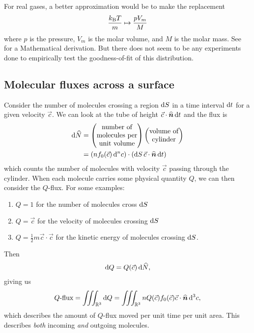 \begin{remark}
For real gases, a better approximation would be to make the
replacement
\begin{equation}
\frac{k_{\textup{B}} T}{m}\mapsto\frac{p V_{m}}{M}
\end{equation}
where $p$ is the pressure, $V_{m}$ is the molar volume, and $M$ is the
molar mass. See~\cite{lente2025direction} for a Mathematical
derivation. But there does not seem to be any experiments done to
empirically test the goodness-of-fit of this distribution.
\end{remark}

\subsection{Molecular fluxes across a surface}

\begin{node}
Consider the number of molecules crossing a region $\mathrm{d} S$ in a time interval
$\mathrm{d} t$ for a given velocity $\vec{c}$. We can look at the tube of height
$\vec{c}\cdot\widehat{\boldsymbol{n}}\,\mathrm{d} t$ and the flux is
\begin{subequations}
  \begin{align}
    \mathrm{d}\widehat{N} &= \begin{pmatrix}\mbox{number of}\\
      \mbox{molecules per}\\
      \mbox{unit volume}
    \end{pmatrix}\begin{pmatrix}\mbox{volume of}\\
      \mbox{cylinder}
    \end{pmatrix}\\
    &=(nf_{0}(\vec{c})\,\mathrm{d}^{n}c)\cdot(\mathrm{d} S\,\vec{c}\cdot\widehat{\boldsymbol{n}}\,\mathrm{d} t)
  \end{align}
\end{subequations}
which counts the number of molecules with velocity $\vec{c}$ passing
through the cylinder. When each molecule carries some physical
quantity $Q$, we can then consider the $Q$-flux. For some examples:
\begin{enumerate}
\item $Q=1$ for the number of molecules cross $\mathrm{d} S$
\item $Q=\vec{c}$ for the velocity of molecules crossing $\mathrm{d} S$
\item $Q=\frac{1}{2}m\vec{c}\cdot\vec{c}$ for the kinetic energy of
  molecules crossing $\mathrm{d} S$.
\end{enumerate}
Then
\begin{equation}
\mathrm{d} Q=Q(\vec{c})\,\mathrm{d}\widehat{N},
\end{equation}
giving us
\begin{equation}
\mbox{$Q$-flux}=\iiint_{\mathbb{R}^{3}}\mathrm{d} Q=\iiint_{\mathbb{R}^{3}}nQ(\vec{c})f_{0}(\vec{c})\vec{c}\cdot\widehat{\boldsymbol{n}}\,\mathrm{d}^{3}c,
\end{equation}
which describes the amount of $Q$-flux moved per unit time per unit
area. This describes \emph{both} incoming \emph{and} outgoing molecules.
\end{node}

